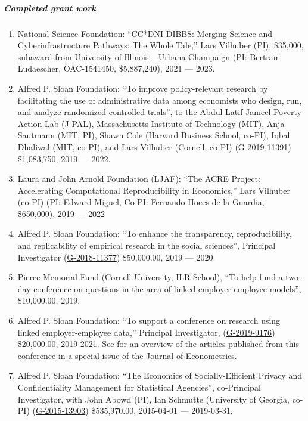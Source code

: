 \documentclass[10pt,letterpaper]{report}
\begin{document}
\subparagraph{Completed grant work}
\begin{enumerate}
	\item National Science Foundation: ``CC*DNI DIBBS: Merging Science and Cyberinfrastructure Pathways: The Whole Tale,'' Lars Vilhuber (PI),  \$35,000, subaward from University of Illinois -- Urbana-Champaign (PI: Bertram Ludaescher, OAC-1541450, \$5,887,240), 2021 --- 2023.
  \item Alfred P. Sloan Foundation: ``To improve policy-relevant research by facilitating the use of administrative data among economists who design, run, and analyze randomized controlled trials'', to the Abdul Latif Jameel Poverty Action	Lab (J-PAL), Massachusetts Institute	of Technology (MIT), Anja Sautmann (MIT, PI), Shawn Cole (Harvard Business School, co-PI), Iqbal Dhaliwal (MIT, co-PI), and Lars Vilhuber (Cornell, co-PI) (G‐2019-11391) \$1,083,750, 2019 --- 2022.
	\item Laura and John Arnold Foundation (LJAF): ``The ACRE Project: Accelerating Computational Reproducibility in Economics,'' Lars Vilhuber (co-PI) (PI: Edward Miguel, Co-PI: Fernando Hoces de la Guardia, \$650,000), 2019 --- 2022
	\item Alfred P. Sloan Foundation: ``To enhance the transparency, reproducibility, and replicability of empirical research in the social sciences'', Principal Investigator  (\href{https://sloan.org/grant-detail/8801}{G-2018-11377})  \$50,000.00, 2019 --- 2020.

	\item Pierce Memorial Fund (Cornell University, ILR School), ``To help fund a two-day conference on questions in the area of linked employer-employee models'', \$10,000.00, 2019.

  \item Alfred P. Sloan Foundation: ``To support a conference on research using linked employer-employee data,'' Principal Investigator, (\href{https://sloan.org/grant-detail/9176}{G‐2019-9176}) \$20,000.00, 2019-2021. See \cite{CARD2023333} for an overview of the articles published from this conference in a special issue of the Journal of Econometrics.

\item Alfred P. Sloan Foundation: ``The Economics of Socially-Efficient Privacy and Confidentiality Management for Statistical Agencies'', co-Principal Investigator, with John Abowd (PI), Ian Schmutte (University of Georgia, co-PI) (\href{https://sloan.org/grant-detail/6845}{G‐2015‐13903}) \$535,970.00, 2015-04-01 --- 2019-03-31.


\end{enumerate}
\end{document}
